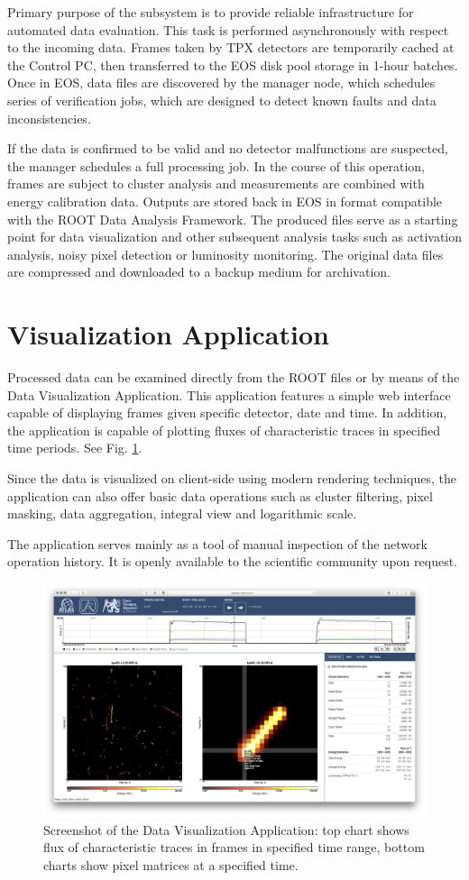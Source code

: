 \documentclass[journal]{IEEEtran}
\begin{document}
Primary purpose of the subsystem is to provide reliable infrastructure for automated data evaluation. This task is performed asynchronously with respect to the incoming data. Frames taken by TPX detectors are temporarily cached at the Control PC, then transferred to the EOS disk pool storage in 1-hour batches. Once in EOS, data files are discovered by the manager node, which schedules series of verification jobs, which are designed to detect known faults and data inconsistencies.

If the data is confirmed to be valid and no detector malfunctions are suspected, the manager schedules a full processing job. In the course of this operation, frames are subject to cluster analysis \cite{Holy2008} and measurements are combined with energy calibration data. \cite{Jakubek2011} Outputs are stored back in EOS in format compatible with the ROOT Data Analysis Framework. \cite{ROOT} The produced files serve as a starting point for data visualization and other subsequent analysis tasks such as activation analysis, noisy pixel detection or luminosity monitoring. The original data files are compressed and downloaded to a backup medium for archivation.

\section{\label{sec:dal}Visualization Application}
Processed data can be examined directly from the ROOT files or by means of the Data Visualization Application. \cite{Manek2016} This application features a simple web interface capable of displaying frames given specific detector, date and time. In addition, the application is capable of plotting fluxes of characteristic traces in specified time periods. See Fig. \ref{fig:positions}.

Since the data is visualized on client-side using modern rendering techniques, the application can also offer basic data operations such as cluster filtering, pixel masking, data aggregation, integral view and logarithmic scale.

The application serves mainly as a tool of manual inspection of the network operation history. It is openly available to the scientific community upon request.

\begin{figure}[tbp]
	\centering
        \includegraphics[clip, width=.45\textwidth, angle = 0 ]{Plots/screen-tpx01-crosshair-zoomed.png}
      \caption {Screenshot of the Data Visualization Application: top chart shows flux of characteristic traces in frames in specified time range, bottom charts show pixel matrices at a specified time.}
    \label{fig:positions}
\end{figure}
\end{document}
